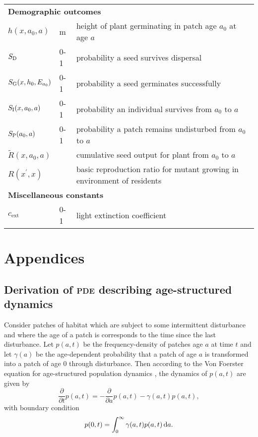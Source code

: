 \documentclass[10pt,twoside]{article}
\begin{document}
\begin{table}[ht]
\begin{tabular}{p{2cm}p{2cm}p{9cm}}
  \multicolumn{3}{l}{\textbf{Demographic outcomes}} \\
  $h(x,a_0,a)$   & m  & height of plant germinating in patch age $a_0$ at age $a$\\
  $S_{\rm D}$ & 0-1 & probability a seed survives dispersal \\
  $S_{\rm G} (x,h_0, E_{a_0})$ & 0-1 & probability a seed germinates successfully \\
  $S_{\rm I} (x, a_0, a)$ & 0-1 & probability an individual survives from $a_0$ to $a$\\
  $S_{\rm P} ( a_0, a)$ & 0-1 & probability a patch remains undisturbed from $a_0$ to $a$\\
  $\tilde{R}(x, a_0, a)$ & & cumulative seed output for plant from $a_0$ to $a$ \\
  $R\left(x^\prime,x\right)$ & & basic reproduction ratio for mutant growing in environment of residents \\
 
  \multicolumn{3}{l}{\textbf{Miscellaneous constants}} \\
  $c_\textrm{ext}$ & 0-1  & light extinction coefficient\\
  \hline
  \end{tabular}
\label{tab:definitions}
\end{table}

\clearpage

\section{Appendices}\label{appendices}

\subsection{Derivation of \textsc{pde} describing age-structured
dynamics}\label{derivation-of-pde-describing-age-structured-dynamics}

Consider patches of habitat which are subject to some intermittent
disturbance and where the age of a patch is corresponds to the time
since the last disturbance. Let \(p(a,t)\) be the frequency-density of
patches age \(a\) at time \(t\) and let \(\gamma(a)\) be the
age-dependent probability that a patch of age \(a\) is transformed into
a patch of age \(0\) through disturbance. Then according to the Von
Foerster equation for age-structured population dynamics
\citep{Vonfoerster-1959}, the dynamics of \(p(a,t)\) are given by
\[ \frac{\partial }{\partial t} p(a,t)=-\frac{\partial }{\partial a} p(a,t)-\gamma(a,t)p(a,t),\]
with boundary condition
\[ p(0,t)=\int^{\infty}_{0}\gamma(a,t)p(a,t)\,{\rm d}a.\]
\end{document}
